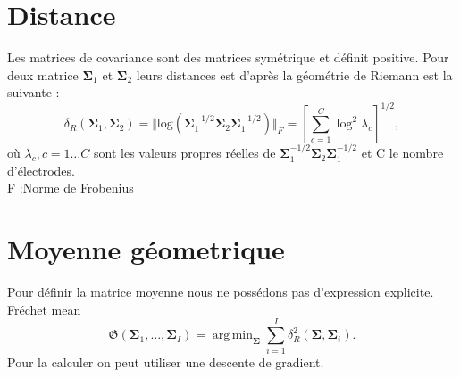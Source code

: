 \documentclass{article}[12pt]
\newcommand{\argmin}{\mathop{\mathrm{arg\,min}}}
\begin{document}
\section{Distance}
Les matrices de covariance sont des matrices symétrique et définit positive.
Pour deux matrice $\mathbf{\Sigma}_1$ et $\mathbf{\Sigma}_2$ leurs distances est d’après la géométrie de Riemann est la suivante :\\
\begin{equation}
\label{eq:Rgeodistance}
\delta_R(\mathbf{\Sigma}_1,\mathbf{\Sigma}_2) 
= 
\Vert \mathrm{log} \left( \mathbf{\Sigma}_1^{-1/2} \mathbf{\Sigma}_2 \mathbf{\Sigma}_1^{-1/2} \right) \Vert_F
=
\left[ \sum_{c=1}^{C} \log^2 \lambda_c \right]^{1/2},
\end{equation}
où $\lambda_c, c=1\ldots C$ sont les valeurs propres réelles de $\mathbf{\Sigma}_1^{-1/2} \mathbf{\Sigma}_2 \mathbf{\Sigma}_1^{-1/2}$ et C le nombre d’électrodes.
\\
F :Norme de Frobenius

\section{Moyenne géometrique}
Pour définir la matrice moyenne nous ne possédons pas d'expression explicite.
Fréchet mean
\begin{equation}
\mathfrak{G} \left( \mathbf{\Sigma}_1,\ldots,\mathbf{\Sigma}_I \right) = \argmin_{\mathbf{\Sigma}} 
\sum_{i=1}^{I} 
\delta_R^2 \left( \mathbf{\Sigma},\mathbf{\Sigma}_i \right).
\label{eq:geo_mean}
\end{equation}
Pour la calculer on peut utiliser une descente de gradient.
\end{document}
